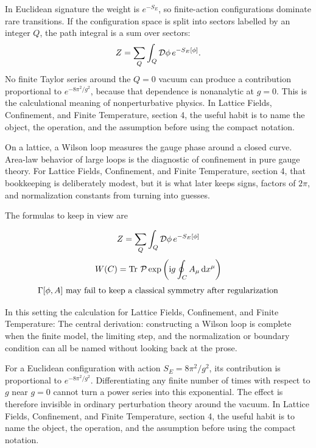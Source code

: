 In Euclidean signature the weight is \(e^{-S_E}\), so finite-action configurations dominate rare transitions.  If the configuration space is split into sectors labelled by an integer \(Q\), the path integral is a sum over sectors:
\[
  Z=\sum_Q\int_Q\mathcal D\phi\,e^{-S_E[\phi]}.
\]
No finite Taylor series around the \(Q=0\) vacuum can produce a contribution proportional to \(e^{-8\pi^2/g^2}\), because that dependence is nonanalytic at \(g=0\).  This is the calculational meaning of nonperturbative physics.  In Lattice Fields, Confinement, and Finite Temperature, section 4, the useful habit is to name the object, the operation, and the assumption before using the compact notation.

On a lattice, a Wilson loop measures the gauge phase around a closed curve.  Area-law behavior of large loops is the diagnostic of confinement in pure gauge theory.  For Lattice Fields, Confinement, and Finite Temperature, section 4, that bookkeeping is deliberately modest, but it is what later keeps signs, factors of \(2\pi\), and normalization constants from turning into guesses.

The formulas to keep in view are

\[
  Z=\sum_Q\int_Q\mathcal D\phi\,e^{-S_E[\phi]}
\]
\[
  W(C)=\operatorname{Tr}\,\mathcal P\exp\left(\mathrm i g\oint_C A_\mu\,\mathrm d x^\mu\right)
\]
\[
  \Gamma[\phi,A]\hbox{ may fail to keep a classical symmetry after regularization}
\]

In this setting the calculation for Lattice Fields, Confinement, and Finite Temperature: The central derivation: constructing a Wilson loop is complete when the finite model, the limiting step, and the normalization or boundary condition can all be named without looking back at the prose.




\begin{example}
For a Euclidean configuration with action \(S_E=8\pi^2/g^2\), its contribution is proportional to \(e^{-8\pi^2/g^2}\).  Differentiating any finite number of times with respect to \(g\) near \(g=0\) cannot turn a power series into this exponential.  The effect is therefore invisible in ordinary perturbation theory around the vacuum.  In Lattice Fields, Confinement, and Finite Temperature, section 4, the useful habit is to name the object, the operation, and the assumption before using the compact notation.
\end{example}



